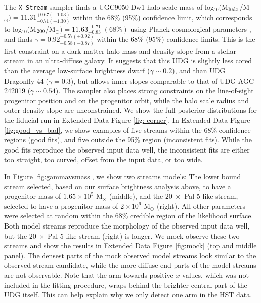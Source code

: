 \documentclass[pdflatex,sn-mathphys-num]{sn-jnl}
\theoremstyle{thmstyleone}
\theoremstyle{thmstyletwo}
\theoremstyle{thmstylethree}
\begin{document}
The \texttt{X-Stream} sampler finds a UGC9050-Dw1 halo scale mass \citep{NibPear2025} of
log$_{10}$(M$_{\rm halo}$/M$_{\odot}) =
11.31^{+0.67(+1.03)}_{-0.71 (-1.30)}$ within the 68\% (95\%) confidence limit, which corresponds to log$_{10}$(M$_{\rm 200}$/M$_{\odot}) = 11.63^{+0.71}_{-0.83} \; (68\%)$  using Planck cosmological parameters \citep{Planck2020}, and finds
$\gamma= 0.92^{+0.57(+0.92)}_{-0.58(-0.87)}$ within the 68\% (95\%) confidence limits.
This is the first constraint on a dark matter halo mass and density slope from a stellar stream in an ultra-diffuse galaxy. It suggests that this UDG is slightly less cored than the average low-surface brightness dwarf ($\gamma \sim 0.2$)\citep{deBlok2001}, and than UDG Dragonfly 44 ($\gamma =0.3$)\citep[][]{vanDokkum2019}, but allows inner slopes comparable to that of UDG AGC 242019 ($\gamma \sim 0.54$)\citep[][]{Brook2021}.
The sampler also places strong constraints on the line-of-sight progenitor position and on the progenitor orbit, while the halo scale radius and outer density slope are unconstrained. We show the full posterior distributions for the fiducial run
in Extended Data Figure \ref{fig: corner}. In Extended Data Figure \ref{fig:good_vs_bad}, we show examples of five streams within the  68\% confidence regions (good fits), and five outside the 95\% region (inconsistent fits). While the good fits reproduce the observed input data well, the inconsistent fits are either too straight, too curved, offset from the input data, or too wide.


In Figure \ref{fig:gammavsmass}, we show two streams models:
The lower bound stream selected, based on our surface brightness analysis above, to have a progenitor mass of $1.65 \times 10^5$ M$_{\odot}$ (middle), and the $20~ \times$ Pal 5-like stream, selected to have a progenitor mass of $2 \times 10^6$ M$_{\odot}$ (right). All other parameters were selected at random within
the  68\% credible region of the likelihood surface.
Both model streams reproduce the morphology of the observed input data well, but the $20~ \times$ Pal 5-like stream (right) is longer.
We mock-observe these two streams and show the results in Extended Data Figure \ref{fig:mock} (top and middle panel). The densest parts of the mock observed model streams look similar to the observed stream candidate, while the more diffuse end parts of the model streams are not observable.
Note that the arm towards positive $x$-values, which was not included in the fitting procedure, wraps behind the brighter central part of the UDG itself. This can help explain why we only detect one arm in the HST data.
\end{document}
